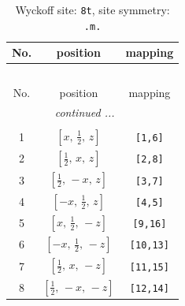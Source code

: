 \documentclass[fleqn,8pt]{jsarticle}
\begin{document}
\renewcommand{\arraystretch}{1.2}
\begin{longtable}{ccc}
\caption{Wyckoff site: {\tt 8t}, site symmetry: {\tt .m.}}
 \\
 \hline \hline
No. & position & mapping \\ \hline \endfirsthead

\multicolumn{2}{l}{\tablename\ \thetable{}} \\
 \hline \hline
No. & position & mapping \\ \hline \endhead

 \hline \hline
\multicolumn{2}{r}{\footnotesize\it continued ...} \\ \endfoot

 \hline \hline
\multicolumn{2}{r}{} \\ \endlastfoot

1 & $\left[ x,\, \frac{1}{2},\, z \right]$ & {\tt [1,6]} \\ \hline
2 & $\left[ \frac{1}{2},\, x,\, z \right]$ & {\tt [2,8]} \\ \hline
3 & $\left[ \frac{1}{2},\, - x,\, z \right]$ & {\tt [3,7]} \\ \hline
4 & $\left[ - x,\, \frac{1}{2},\, z \right]$ & {\tt [4,5]} \\ \hline
5 & $\left[ x,\, \frac{1}{2},\, - z \right]$ & {\tt [9,16]} \\ \hline
6 & $\left[ - x,\, \frac{1}{2},\, - z \right]$ & {\tt [10,13]} \\ \hline
7 & $\left[ \frac{1}{2},\, x,\, - z \right]$ & {\tt [11,15]} \\ \hline
8 & $\left[ \frac{1}{2},\, - x,\, - z \right]$ & {\tt [12,14]} \\
\end{longtable}
\renewcommand{\arraystretch}{1.2}
\end{document}
